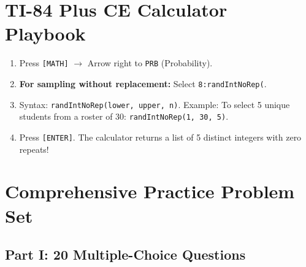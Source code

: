 \section{TI-84 Plus CE Calculator Playbook}

\begin{calculatorbox}
\begin{enumerate}[leftmargin=1.2em]
  \item Press \texttt{[MATH]} $\rightarrow$ Arrow right to \texttt{PRB} (Probability).
  \item \textbf{For sampling without replacement:} Select \texttt{8:randIntNoRep(}.
  \item Syntax: \texttt{randIntNoRep(lower, upper, n)}.
  Example: To select 5 unique students from a roster of 30: \texttt{randIntNoRep(1, 30, 5)}.
  \item Press \texttt{[ENTER]}. The calculator returns a list of 5 distinct integers with zero repeats!
\end{enumerate}
\end{calculatorbox}

\section{Comprehensive Practice Problem Set}

\subsection*{Part I: 20 Multiple-Choice Questions}

